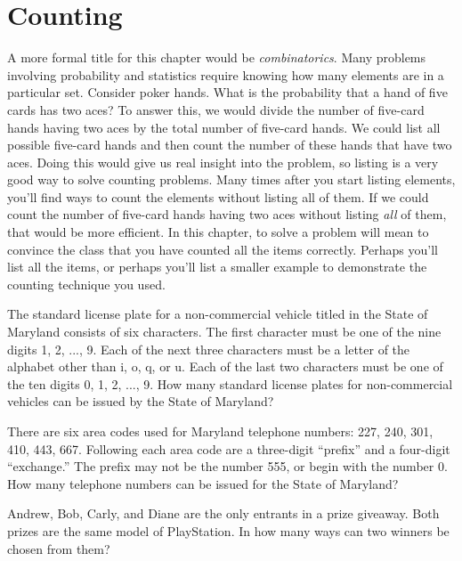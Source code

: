 \chapter{Counting}

A more formal title for this chapter would be \emph{combinatorics}.  Many problems involving probability and statistics require knowing how many elements are in a particular set.  Consider poker hands. What is the probability that a hand of five cards has two aces? To answer this, we would divide the number of five-card hands having two aces by the total number of five-card hands. We could list all possible five-card hands and then count the number of these hands that have two aces. Doing this would give us real insight into the problem, so listing is a very good way to solve counting problems. Many times after you start listing elements, you'll find ways to count the elements without listing all of them. If we could count the number of five-card hands having two aces without listing \emph{all} of them, that would be more efficient. In this chapter, to solve a problem will mean to convince the class that you have counted all the items correctly.  Perhaps you'll list all the items, or perhaps you'll list a smaller example to demonstrate the counting technique you used.

\begin{prb}
The standard license plate for a non-commercial vehicle titled in the State of Maryland consists of six characters. The first character must be one of the nine digits 1, 2, ..., 9.  Each of the next three characters must be a letter of the alphabet other than i, o, q, or u.  Each of the last two characters must be one of the ten digits 0, 1, 2, ..., 9. How many standard license plates for non-commercial vehicles can be issued by the State of Maryland?
\end{prb}

\begin{prb}
There are six area codes used for Maryland telephone numbers: 227, 240, 301, 410, 443, 667. Following each area code are a three-digit ``prefix'' and a four-digit ``exchange.''  The prefix may not be the number 555, or begin with the number 0.  How many telephone numbers can be issued for the State of Maryland?
\end{prb}

\begin{prb}
\label{p1}
Andrew, Bob, Carly, and Diane are the only entrants in a prize giveaway.  Both prizes are the same model of PlayStation. In how many ways can two winners be chosen from them?
\begin{annotation}
\end{annotation}
\end{prb}


